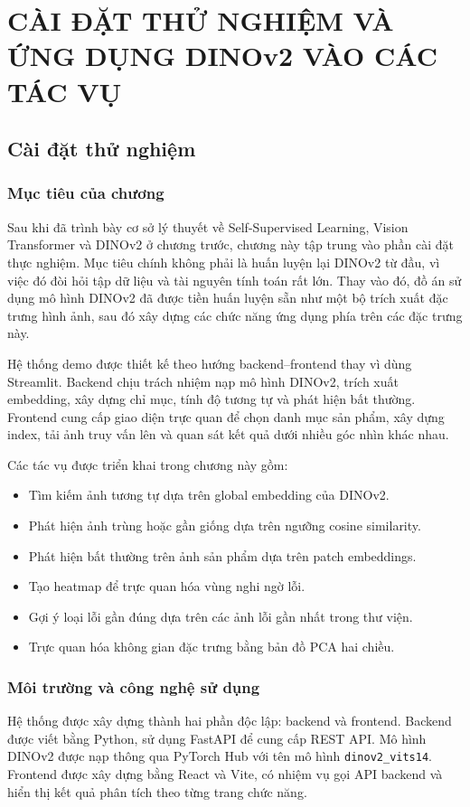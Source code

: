 \chapter{CÀI ĐẶT THỬ NGHIỆM VÀ ỨNG DỤNG DINOv2 VÀO CÁC TÁC VỤ}

\section{Cài đặt thử nghiệm}
\subsection{Mục tiêu của chương}
Sau khi đã trình bày cơ sở lý thuyết về Self-Supervised Learning, Vision Transformer và DINOv2 ở chương trước, chương này tập trung vào phần cài đặt thực nghiệm. Mục tiêu chính không phải là huấn luyện lại DINOv2 từ đầu, vì việc đó đòi hỏi tập dữ liệu và tài nguyên tính toán rất lớn. Thay vào đó, đồ án sử dụng mô hình DINOv2 đã được tiền huấn luyện sẵn như một bộ trích xuất đặc trưng hình ảnh, sau đó xây dựng các chức năng ứng dụng phía trên các đặc trưng này.

Hệ thống demo được thiết kế theo hướng backend--frontend thay vì dùng Streamlit. Backend chịu trách nhiệm nạp mô hình DINOv2, trích xuất embedding, xây dựng chỉ mục, tính độ tương tự và phát hiện bất thường. Frontend cung cấp giao diện trực quan để chọn danh mục sản phẩm, xây dựng index, tải ảnh truy vấn lên và quan sát kết quả dưới nhiều góc nhìn khác nhau.

Các tác vụ được triển khai trong chương này gồm:

\begin{itemize}
    \item Tìm kiếm ảnh tương tự dựa trên global embedding của DINOv2.
    \item Phát hiện ảnh trùng hoặc gần giống dựa trên ngưỡng cosine similarity.
    \item Phát hiện bất thường trên ảnh sản phẩm dựa trên patch embeddings.
    \item Tạo heatmap để trực quan hóa vùng nghi ngờ lỗi.
    \item Gợi ý loại lỗi gần đúng dựa trên các ảnh lỗi gần nhất trong thư viện.
    \item Trực quan hóa không gian đặc trưng bằng bản đồ PCA hai chiều.
\end{itemize}

\subsection{Môi trường và công nghệ sử dụng}
Hệ thống được xây dựng thành hai phần độc lập: backend và frontend. Backend được viết bằng Python, sử dụng FastAPI để cung cấp REST API. Mô hình DINOv2 được nạp thông qua PyTorch Hub với tên mô hình \texttt{dinov2\_vits14}. Frontend được xây dựng bằng React và Vite, có nhiệm vụ gọi API backend và hiển thị kết quả phân tích theo từng trang chức năng.

